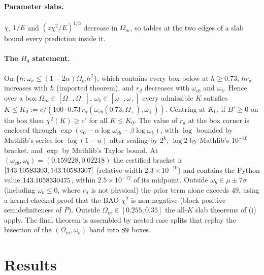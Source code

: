 \documentclass[11pt]{article}
\begin{document}
\paragraph{Parameter slabs.} $\chi$, $1/E$ and $(z\chi^2/E)^{1/3}$ decrease in $\Omega_m$, so tables at the two edges of a slab bound every prediction inside it.

\paragraph{The $H_0$ statement.} On $\{h:\omega_\nu\le(1-2\alpha)\Omega_m h^2\}$, which contains every box below at $h\ge0.73$, $h r_d$ increases with $h$ (imported theorem), and
$r_d$ decreases with $\omega_{cb}$ and $\omega_b$. Hence over a box $\Omega_m\in[\Omega_-,\Omega_+]$, $\omega_b\in[\omega_-,\omega_+]$ every admissible $K$ satisfies
$K\le K_0:=c/(100\cdot0.73\,r_d(\omega_{cb}(0.73,\Omega_+),\omega_+))$. Centring at $K_0$, if $B'\ge0$ on the box then $\chi^2(K)\ge c'$ for all $K\le K_0$. The value of $r_d$ at the
box corner is enclosed through $\exp(c_0-\alpha\log\omega_{cb}-\beta\log\omega_b)$, with $\log$ bounded by Mathlib's series for $\log(1-u)$ after scaling by $2^k$, $\log2$ by
Mathlib's $10^{-10}$ bracket, and $\exp$ by Mathlib's Taylor bound. At $(\omega_{cb},\omega_b)=(0.159228,0.02218)$ the certified bracket is $[143.10583303,143.10583307]$ (relative width
$2.3\times10^{-10}$) and contains the Python value $143.1058330475$, within $2.5\times10^{-12}$ of its midpoint. Outside $\omega_b\in\mu\pm7\sigma$ (including $\omega_b\le0$, where $r_d$ is not
physical) the prior term alone exceeds $49$, using a kernel-checked proof that the BAO $\chi^2$ is non-negative (block positive semidefiniteness of $P$). Outside
$\Omega_m\in[0.255,0.35]$ the all-$K$ slab theorems of (i) apply. The final theorem is assembled by nested case splits that replay the bisection of the
$(\Omega_m,\omega_b)$ band into $89$ boxes.

\section{Results}
\end{document}
